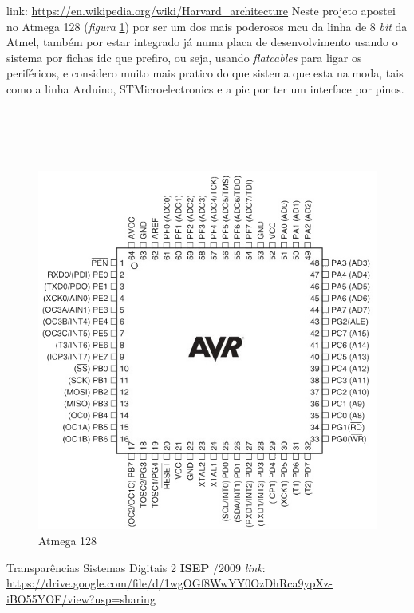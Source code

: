 \qquad link: \url{https://en.wikipedia.org/wiki/Harvard_architecture}
\newpage
Neste projeto apostei no Atmega 128 (\textit{figura} \ref{Atmega_128_pinagem}) por ser um dos mais poderosos \ac{mcu} da linha de 8 \textit{bit} da Atmel, também por estar integrado já numa placa de desenvolvimento usando o sistema por fichas \ac{idc} que prefiro, ou seja, usando \textit{flatcables} para ligar os periféricos, e considero muito mais pratico do que sistema que esta na moda, tais como a linha Arduino, STMicroelectronics e a \ac{pic} por ter um interface por pinos.
\\
\\
\\
\\
\\
\begin{figure}[H]
	\centering
	\includegraphics[scale=0.7]{./image/PESTA/material/Atmega128_1.jpg}
	\caption{Atmega 128}
	\label{Atmega_128_pinagem}
\end{figure}
{Transparências Sistemas Digitais 2 \quad \textbf{ISEP} /2009 \quad \textit{link}}:
\\
\url{https://drive.google.com/file/d/1wgOGf8WwYY0OzDhRca9ypXz-iBO55YOF/view?usp=sharing}
